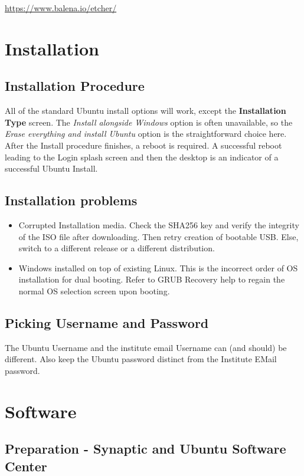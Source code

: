 \documentclass[10pt,letterpaper]{article}
\begin{document}
\url{https://www.balena.io/etcher/} \\

\newpage

\section{Installation}

\subsection{Installation Procedure}
All of the standard Ubuntu install options will work, except the \textbf{Installation Type} screen. The \textit{Install alongside Windows} option is often unavailable, so the \textit{Erase everything and install Ubuntu} option is the straightforward choice here. After the Install procedure finishes, a reboot is required. A successful reboot leading to the Login splash screen and then the desktop is an indicator of a successful Ubuntu Install.

\subsection{Installation problems}

\begin{itemize}
	\item Corrupted Installation media. Check the SHA256 key and verify the integrity of the ISO file after downloading. Then retry creation of bootable USB. Else, switch to a different release or a different distribution.
	\item Windows installed on top of existing Linux. This is the incorrect order of OS installation for dual booting. Refer to GRUB Recovery help to regain the normal OS selection screen upon booting.
\end{itemize}

\subsection{Picking Username and Password}
The Ubuntu Username and the institute email Username can (and should) be different. Also keep the Ubuntu password distinct from the Institute EMail password.

\newpage

\section{Software}
\subsection{Preparation - Synaptic and Ubuntu Software Center}
\end{document}
